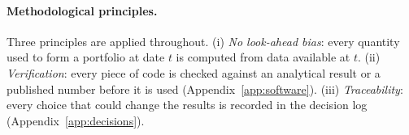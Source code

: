 \paragraph{Methodological principles.}
Three principles are applied throughout.
(i) \emph{No look-ahead bias}: every quantity used to form a portfolio at date $t$ is computed from data available at $t$.
(ii) \emph{Verification}: every piece of code is checked against an analytical result or a published number before it is used (Appendix~\ref{app:software}).
(iii) \emph{Traceability}: every choice that could change the results is recorded in the decision log (Appendix~\ref{app:decisions}).
